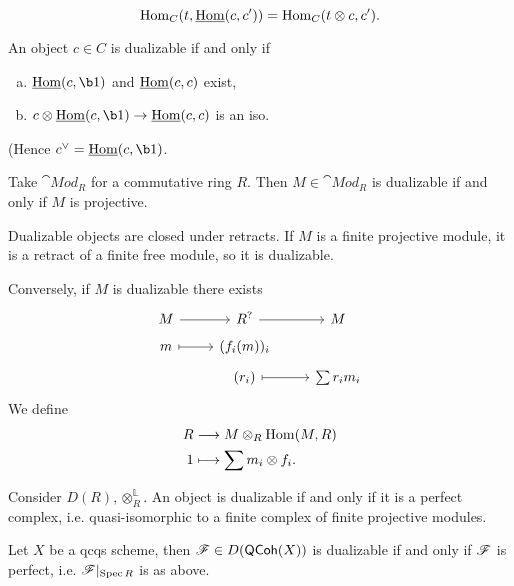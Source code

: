 \[
	\operatorname{Hom}_C(t,\underline{\operatorname{Hom}}(c,c')) = \operatorname{Hom}_C(t\otimes c,c')
.\] 
\begin{corollary}
	An object $c\in C$ is dualizable if and only if
	\begin{enumerate}[a)]
		\item $\iHom(c,\b1)$ and  $\underline{\operatorname{Hom}}(c,c)$ exist,
		\item $c\otimes \iHom(c,\b1)\to \iHom(c,c)$ is an iso.
	\end{enumerate}
	(Hence $c^{\vee} = \iHom(c,\b1)$.
\end{corollary}
\begin{example}
	Take $\cat{Mod}_R$ for a commutative ring $R$. Then $M\in \cat{Mod}_R$ is dualizable if and only if $M$ is projective.

	Dualizable objects are closed under retracts. If $M$ is a finite projective module, it is a retract of a finite free module, so it is dualizable.

	Conversely, if $M$ is dualizable there exists
	\[
	\begin{tikzcd}[row sep=tiny]
		M \ar[r] & R^{?} \ar[r] & M \\
		m \ar[r,mapsto] & (f_i(m))_i \\
				& (r_i) \ar[r, mapsto] & \sum r_im_i 
	\end{tikzcd}
	\]
	We define
	\begin{align*}
		R &\longrightarrow M\otimes_R \operatorname{Hom}(M,R) \\
		1 &\longmapsto \sum m_i\otimes f_i
	.\end{align*}
\end{example}
\begin{example}
	Consider $D(R),\otimes_R^{\mathbb{L}}$. An object is dualizable if and only if it is a perfect complex, i.e. quasi-isomorphic to a finite complex of finite projective modules.
\end{example}
\begin{example}
	Let $X$ be a qcqs scheme, then $\mathscr{F}\in D(\mathsf{QCoh}(X))$ is dualizable if and only if $\mathscr{F}$ is perfect, i.e. $\mathscr{F}|_{\operatorname{Spec} R}$ is as above.
\end{example}
